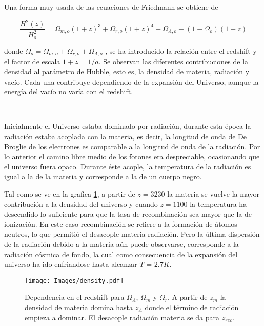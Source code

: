 \documentclass[a4,useAMS,usenatbib,usegraphicx,12pt]{article}
\begin{document}
Una forma muy usada de las ecuaciones de Friedmann se obtiene de

\begin{equation}
\frac{H^2(z)}{H_o^{2}}=\Omega_{m,o}\left(1+z\right)^3+
\Omega_{r,o}\left(1+z\right)^4+ \Omega_{\Lambda,o} + ( 1-\Omega_o)
\left(1+z\right)
\label{fried2}
\end{equation}

donde $\Omega_o=\Omega_{m,o} +\Omega_{r,o}+\Omega_{\Lambda,o}$ ,
se ha introducido la relación entre el redshift y el factor de escala 
$1+z=1/a$. Se observan las diferentes contribuciones de la densidad al 
parámetro de Hubble, esto es, la densidad de materia, radiación y vacío. 
Cada una contribuye dependiendo de la expansión del Universo, aunque 
la energía del vacío no varía con el redshift.

\

Inicialmente el Universo estaba dominado por radiación, 
durante esta época la radiación estaba acoplada con la materia, 
es decir, la longitud de onda de De Broglie de los electrones es 
comparable a la longitud de onda de la radiación. Por lo anterior 
el camino libre medio de los fotones era despreciable, ocasionando
que el universo fuera opaco. 
Durante éste acople, la temperatura de la radiación es igual a 
la de la materia y corresponde a la de un cuerpo negro. 

Tal como se ve en la grafica \ref{densidad}, a partir de $z=3230$ la materia
se vuelve la mayor contribuci\'on a la densidad del universo y
cuando $z=1100$ la temperatura ha descendido lo suficiente para que 
la tasa de recombinación sea mayor que la de ionización. 
En este caso recombinación se refiere a la formación de átomos neutros, 
lo que permitió el desacople materia radiación.
Pero la última dispersión de la radiación debido a la 
materia aún puede observarse, corresponde a la radiación 
cósmica de fondo, la cual como consecuencia de la expansión del universo 
ha ido enfriandose hasta alcanzar $T$ = $2.7K$. 
  
\begin{figure}[htbp]
       \centering
               \texttt{[image: Images/density.pdf]}
       \caption{ \small Dependencia en el redshift para $\Omega_\Lambda$, $\Omega_m$ y $\Omega_r$.
       A partir de $z_m$ la densidad de materia domina hasta $z_\Lambda$ 
       donde el término de radiación empieza a dominar. El desacople radiación materia 
       se da para $z_{rec}$. }
       \label{densidad}
 \end{figure}
\end{document}
